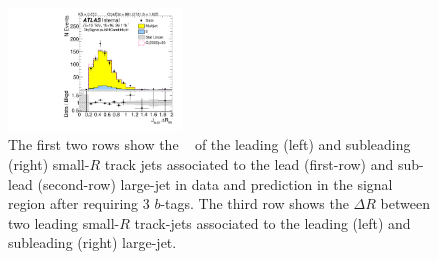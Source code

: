 \begin{figure}[htb!]
\begin{center}
\includegraphics[width=0.41\textwidth,angle=-90]{figures/boosted/Signal/b77_ThreeTag_Signal_sublHCand_trk_dr.pdf}
  \caption{The first two rows show the \pt~ of the leading (left) and subleading (right) small-$R$ track jets associated to the lead (first-row) and sub-lead (second-row) large-\R jet in data and prediction in the signal region after requiring 3 $b$-tags. The third row shows the $\Delta R$ between two leading small-$R$ track-jets associated to the leading (left) and subleading (right) large-\R jet.  }
  \label{fig:boosted-3b-signal-ak2}
\end{center}
\end{figure}


